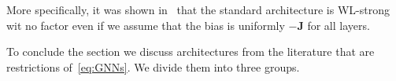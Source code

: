 
More specifically, it was shown in~\cite{grohewl} that the standard architecture is WL-strong wit no factor even if we assume that the bias is uniformly $- \mathbf{J}$ for all layers.

To conclude the section we discuss architectures from the literature that are restrictions of~\eqref{eq:GNNs}. We divide them into three groups.

